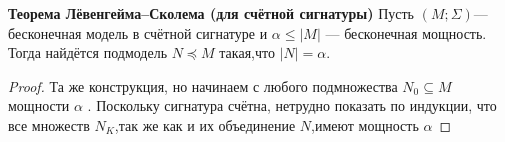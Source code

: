 \begin{theorem}\textbf{Теорема Лёвенгейма–Сколема (для счётной сигнатуры)}
     Пусть $(M ;\Sigma)$— бесконечная модель в счётной сигнатуре и $\alpha \leq |M|$
    — бесконечная мощность. Тогда найдётся подмодель $N \preceq M$ такая,что $|N|=\alpha$.
\end{theorem}
\begin{proof}
    Та же конструкция, но начинаем с любого подмножества $N_0\subseteq M$
    мощности $\alpha$ . Поскольку сигнатура счётна, нетрудно показать по индукции, что все множеств $N_K$,так же как и их объединение $N$,имеют мощность $\alpha$ 
\end{proof}
